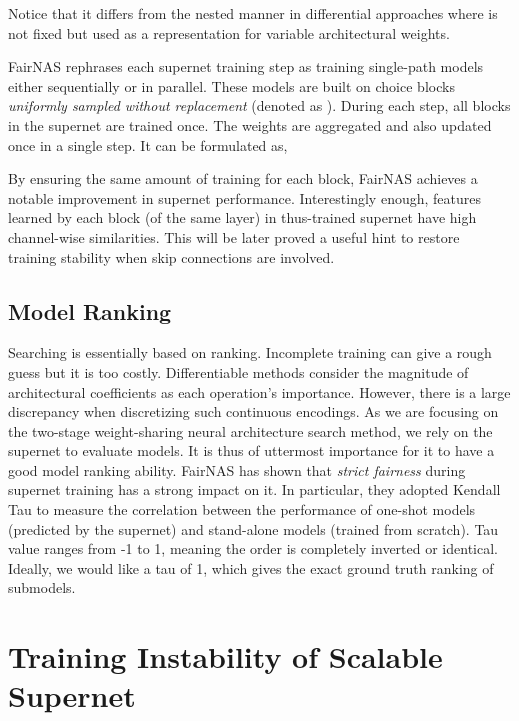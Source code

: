 \documentclass[runningheads]{llncs}
\begin{document}
Notice that it differs from the nested manner in differential approaches \cite{liu2018darts,dong2019searching} where  is not fixed but used as a representation for variable architectural weights. 

FairNAS \cite{chu2019fairnas} rephrases each supernet training step as training  single-path models either sequentially or in parallel. These models are built on choice blocks \emph{uniformly sampled without replacement} (denoted as ). During each step, all blocks in the supernet are trained once. The weights are aggregated and also updated once in a single step. It can be formulated as,





By ensuring the same amount of training for each block, FairNAS achieves a notable improvement in supernet performance. Interestingly enough, features learned by each block (of the same layer) in thus-trained supernet have high channel-wise similarities. This will be later proved a useful hint to restore training stability when skip connections are involved. 

\subsection{Model Ranking}
Searching is essentially based on ranking. Incomplete training can give a rough guess \cite{zoph2018learning} but it is too costly. Differentiable methods \cite{liu2018darts} consider the magnitude of architectural coefficients as each operation's importance. However, there is a large discrepancy when discretizing such continuous encodings.  As we are focusing on the two-stage weight-sharing neural architecture search method, we rely on the supernet to evaluate models. It is thus of uttermost importance for it to have a good model ranking ability. FairNAS \cite{chu2019fairnas} has shown that \emph{strict fairness} during supernet training has a strong impact on it.  In particular, they adopted Kendall Tau \cite{kendall1938new} to measure the correlation between the performance of one-shot models (predicted by the supernet) and stand-alone models (trained from scratch). Tau value ranges from -1 to 1, meaning the order is completely inverted or identical. Ideally, we would like a tau of 1, which gives the exact ground truth ranking of submodels.

\section{Training Instability of Scalable Supernet}\label{sec:instability}
\end{document}
